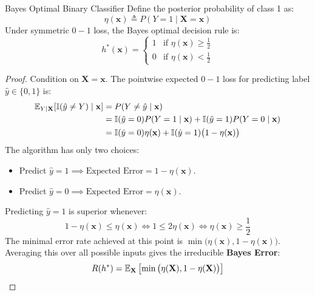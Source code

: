 \begin{theorembox}{Bayes Optimal Binary Classifier}
Define the posterior probability of class 1 as:
\begin{equation}
\eta(\mathbf{x}) \triangleq P(Y = 1 \mid \mathbf{X} = \mathbf{x})
\end{equation}
Under symmetric $0-1$ loss, the Bayes optimal decision rule is:
\begin{equation}
h^*(\mathbf{x}) = \begin{cases} 
1 & \text{if } \eta(\mathbf{x}) \ge \frac{1}{2} \\
0 & \text{if } \eta(\mathbf{x}) < \frac{1}{2}
\end{cases}
\label{eq:bayes_classifier_rule_ped}
\end{equation}
\end{theorembox}

\begin{proof}
Condition on $\mathbf{X} = \mathbf{x}$. The pointwise expected $0-1$ loss for predicting label $\hat{y} \in \{0, 1\}$ is:
\begin{align}
\operatorname{\mathbb{E}}_{Y \mid \mathbf{X}} [\mathbb{I}(\hat{y} \ne Y) \mid \mathbf{x}] &= P(Y \ne \hat{y} \mid \mathbf{x}) \nonumber \\
&= \mathbb{I}(\hat{y} = 0) P(Y = 1 \mid \mathbf{x}) + \mathbb{I}(\hat{y} = 1) P(Y = 0 \mid \mathbf{x}) \nonumber \\
&= \mathbb{I}(\hat{y} = 0) \eta(\mathbf{x}) + \mathbb{I}(\hat{y} = 1) \big(1 - \eta(\mathbf{x})\big)
\end{align}
The algorithm has only two choices:
\begin{itemize}
    \item Predict $\hat{y} = 1 \implies \text{Expected Error} = 1 - \eta(\mathbf{x})$.
    \item Predict $\hat{y} = 0 \implies \text{Expected Error} = \eta(\mathbf{x})$.
\end{itemize}
Predicting $\hat{y} = 1$ is superior whenever:
\begin{equation}
1 - \eta(\mathbf{x}) \le \eta(\mathbf{x}) \iff 1 \le 2\eta(\mathbf{x}) \iff \eta(\mathbf{x}) \ge \frac{1}{2}
\end{equation}
The minimal error rate achieved at this point is $\min\big(\eta(\mathbf{x}), 1 - \eta(\mathbf{x})\big)$. Averaging this over all possible inputs gives the irreducible \textbf{Bayes Error}:
\begin{equation}
R(h^*) = \operatorname{\mathbb{E}}_{\mathbf{X}} \left[ \min\big(\eta(\mathbf{X}), 1 - \eta(\mathbf{X})\big) \right]
\end{equation}
\end{proof}

